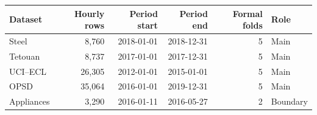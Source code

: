 \begin{tabular}{lrrrrl}
\toprule
Dataset & Hourly rows & Period start & Period end & Formal folds & Role \\
\midrule
Steel & 8,760 & 2018-01-01 & 2018-12-31 & 5 & Main \\
Tetouan & 8,737 & 2017-01-01 & 2017-12-31 & 5 & Main \\
UCI--ECL & 26,305 & 2012-01-01 & 2015-01-01 & 5 & Main \\
OPSD & 35,064 & 2016-01-01 & 2019-12-31 & 5 & Main \\
Appliances & 3,290 & 2016-01-11 & 2016-05-27 & 2 & Boundary \\
\bottomrule
\end{tabular}
